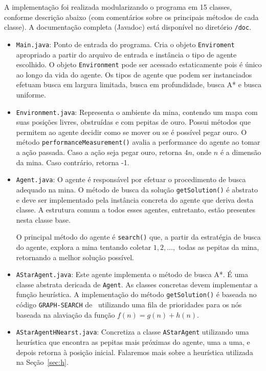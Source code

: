 \documentclass[12pt,a4paper]{article}
\begin{document}
A implementação foi realizada modularizando o programa em 15 classes, conforme descrição abaixo
(com comentários sobre os principais métodos de cada classe). A documentação completa (Javadoc) está
disponível no diretório \verb|/doc|.

\begin{itemize}

  \item{\verb|Main.java|}: Ponto de entrada do programa. Cria o objeto \verb|Enviroment| apropriado 
  a partir do arquivo de entrada e instância o tipo de agente escolhido. O objeto \verb|Environment| 
  pode ser acessado estaticamente pois é único ao longo da vida do agente. Os tipos de agente que 
  podem ser instanciados efetuam busca em largura limitada, busca em profundidade, busca A* e busca 
  uniforme.

  \item{\verb|Environment.java|}: Representa o ambiente da mina, contendo um mapa com suas posições 
  livres, obstruídas e com pepitas de ouro. Possui métodos que permitem ao agente decidir como se 
  mover ou se é possível pegar ouro. O método \verb|performanceMeasurement()| avalia a performance 
  do agente ao tomar a ação passada. Caso a ação seja pegar ouro, retorna $4n$, onde $n$ é a 
  dimensão da mina. Caso contrário, retorna -1. 

  \item{\verb|Agent.java|}: O agente é responsável por efetuar o procedimento de busca adequado
  na mina. O método de busca da solução \verb|getSolution()| é abstrato e deve ser implementado pela 
  instância concreta do agente que deriva desta classe. A estrutura comum a todos esses agentes, 
  entretanto, estão presentes nesta classe base.

  O principal método do agente é \verb|search()| que, a partir da estratégia de busca do agente, 
  explora a mina tentando coletar $1, 2, \ldots,$ todas as pepitas da mina, retornando a melhor
  solução possível.

  \item{\verb|AStarAgent.java|}: Este agente implementa o método de busca A*. É uma classe abstrata
  dericada de \verb|Agent|. As classes concretas devem implementar a função heurística. A 
  implementação do método \verb|getSolution()| é baseada no código \verb|GRAPH-SEARCH| 
  de~\cite{aima} utilizando uma fila de prioridades para os nós baseada na alaviação da função 
  $f(n) = g(n) + h(n)$.

  \item{\verb|AStarAgentHNearst.java|}: Concretiza a classe \verb|AStarAgent| utilizando uma 
  heurística que encontra as pepitas mais próximas do agente, uma a uma, e depois retorna à posição 
  inicial. Falaremos mais sobre a heurística utilizada na Seção~\ref{sec:h}.


\end{itemize}
\end{document}
